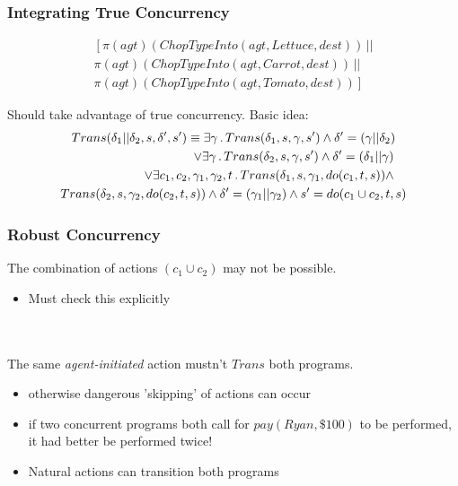 \documentclass[compress]{beamer}
\begin{document}
\begin{frame}
\frametitle{Integrating True Concurrency}
\begin{multline*}
\left[\pi(agt)(ChopTypeInto(agt,Lettuce,dest))\,||\right.\\
\pi(agt)(ChopTypeInto(agt,Carrot,dest))\,||\\
\left.\pi(agt)(ChopTypeInto(agt,Tomato,dest))\right]
\end{multline*}

Should take advantage of true concurrency.  Basic idea:
\begin{multline*}
Trans(\delta_{1}||\delta_{2},s,\delta',s')\equiv\exists\gamma\,.\, Trans(\delta_{1},s,\gamma,s')\wedge\delta'=(\gamma||\delta_{2})\\
\shoveright{\vee\exists\gamma\,.\, Trans(\delta_{2},s,\gamma,s')\wedge\delta'=(\delta_{1}||\gamma)}\\
\shoveright{\vee\exists c_{1},c_{2},\gamma_{1},\gamma_{2},t\,.\, Trans(\delta_{1},s,\gamma_{1},do(c_{1},t,s))\wedge}\\ 
Trans(\delta_{2},s,\gamma_{2},do(c_{2},t,s))\wedge\delta'=(\gamma_{1}||\gamma_{2})\wedge s'=do(c_{1}\cup c_{2},t,s)
\end{multline*}
\end{frame}

\begin{frame}
\frametitle{Robust Concurrency}
The combination of actions $(c_1\cup c_2)$ may not be possible.
\begin{itemize}
  \item Must check this explicitly
\end{itemize}
\ \\
\ \\
The same \emph{agent-initiated} action mustn't $Trans$ both programs.
\begin{itemize}
  \item otherwise dangerous 'skipping' of actions can occur
  \item if two concurrent programs both call for $pay(Ryan,\$100)$ to be performed, it had better be performed twice!
  \item Natural actions can transition both programs
\end{itemize}
\end{frame}
\end{document}
